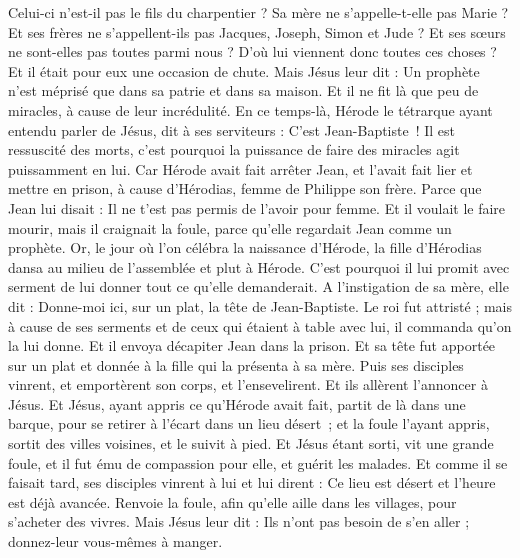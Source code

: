 \begin{multicols}{2}
{Celui-ci n'est-il pas le fils du charpentier ? Sa mère ne s'appelle-t-elle pas Marie ? Et ses frères ne s'appellent-ils pas Jacques, Joseph, Simon et Jude ?
Et ses sœurs ne sont-elles pas toutes parmi nous ? D'où lui viennent donc toutes ces choses ?
Et il était pour eux une occasion de chute. Mais Jésus leur dit : Un prophète n'est méprisé que dans sa patrie et dans sa maison.
Et il ne fit là que peu de miracles, à cause de leur incrédulité.
\VerseOne{}En ce temps-là, Hérode le tétrarque ayant entendu parler de Jésus, dit à ses serviteurs : C’est Jean-Baptiste !
Il est ressuscité des morts, c'est pourquoi la puissance de faire des miracles agit puissamment en lui.
Car Hérode avait fait arrêter Jean, et l'avait fait lier et mettre en prison, à cause d'Hérodias, femme de Philippe son frère.
Parce que Jean lui disait : Il ne t'est pas permis de l'avoir pour femme.
Et il voulait le faire mourir, mais il craignait la foule, parce qu’elle regardait Jean comme un prophète.
Or, le jour où l’on célébra la naissance d'Hérode, la fille d'Hérodias dansa au milieu de l’assemblée et plut à Hérode.
C'est pourquoi il lui promit avec serment de lui donner tout ce qu'elle demanderait.
A l’instigation de sa mère, elle dit : Donne-moi ici, sur un plat, la tête de Jean-Baptiste.
Le roi fut attristé ; mais à cause de ses serments et de ceux qui étaient à table avec lui, il commanda qu'on la lui donne.
Et il envoya décapiter Jean dans la prison.
Et sa tête fut apportée sur un plat et donnée à la fille qui la présenta à sa mère.
Puis ses disciples vinrent, et emportèrent son corps, et l'ensevelirent. Et ils allèrent l’annoncer à Jésus.
Et Jésus, ayant appris ce qu’Hérode avait fait, partit de là dans une barque, pour se retirer à l’écart dans un lieu désert ; et la foule l’ayant appris, sortit des villes voisines, et le suivit à pied.
Et Jésus étant sorti, vit une grande foule, et il fut ému de compassion pour elle, et guérit les malades.
Et comme il se faisait tard, ses disciples vinrent à lui et lui dirent : Ce lieu est désert et l'heure est déjà avancée. Renvoie la foule, afin qu'elle aille dans les villages, pour s’acheter des vivres.
Mais Jésus leur dit : Ils n'ont pas besoin de s'en aller ; donnez-leur vous-mêmes à manger.
}
\end{multicols}

